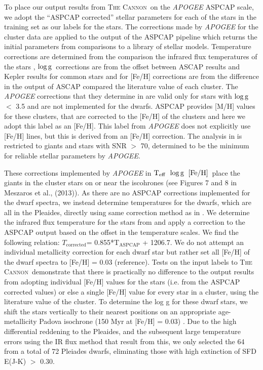 \documentclass[12pt, preprint]{aastex}
\newcommand{\teff}{\mbox{$\rm T_{eff}$}}
\newcommand{\feh}{\mbox{$\rm [Fe/H]$}}
\newcommand{\logg}{\mbox{$\rm \log g$}}
\newcommand{\tc}{\textsc{The Cannon}}
\begin{document}

To place our output results from \tc\ on the \textit{APOGEE} ASPCAP scale, we adopt the ``ASPCAP corrected'' stellar parameters for each of the stars in the training set as our labels for the stars. The corrections made by \textit{APOGEE} for the cluster data are applied to the output of the ASPCAP pipeline which returns the initial parameters from comparisons to a library of stellar models. Temperature corrections are determined from the comparison the infrared flux temperatures of the stars \citep{Gonzalez2009}, \logg\ corrections are from the offset between ASCAP results and Kepler results for common stars and for [Fe/H] corrections are from the difference in the output of ASCAP compared the literature value of each cluster.  The \textit{APOGEE} corrections that they determine in \citet{Meszaros2013} are valid only for stars with \logg\ $<$ 3.5 and are not implemented for the dwarfs. ASPCAP provides [M/H] values for these clusters, that are corrected to the [Fe/H] of the clusters and here we adopt this label as an [Fe/H]. This label from \textit{APOGEE} does not explicitly use [Fe/H] lines, but this is derived from an [Fe/H] correction. The analysis in \citet{Meszaros2013} is restricted to giants and stars with SNR $>$ 70, determined to be the minimum for reliable stellar parameters by \textit{APOGEE}. 

These corrections implemented by \textit{APOGEE} in \teff\, \logg\, \feh\ place the giants in the cluster stars on or near the iscohrones (see Figures 7 and 8 in Meszaros et al., (2013)).  As there are no ASPCAP corrections implemented for the dwarf spectra, we instead determine temperatures for the dwarfs, which are all in the Pleaides, directly using same correction method as in \citet{Meszaros2013}. We determine the infrared flux temperature for the stars from \citep{Gonzalez2009} and apply a correction to the ASPCAP output based on the offset in the temperature scales. We find the following relation: $T_{\mbox{corrected}}$= 0.855*T$_{\mbox{ASPCAP}}$ + 1206.7. We do not attempt an individual metallicity correction for each dwarf star but rather set all [Fe/H] of the dwarf spectra to [Fe/H] = 0.03 (reference). Tests on the input labels to \tc\ demonstrate that there is practically no difference to the output results from adopting individual [Fe/H] values for the stars (i.e. from the ASPCAP corrected values) or else a single [Fe/H] value for every star in a cluster, using the literature value of the cluster. To determine the log g for these dwarf stars, we shift the stars vertically to their nearest positions on an appropriate age-metallicity Padova isochrone (150 Myr at [Fe/H] = 0.03) \citep{Girardi2010}. Due to the high differential reddening to the Pleaides, and the subsequent large temperature errors using the IR flux method that result from this, we only selected the 64 from a total of 72 Pleiades dwarfs, eliminating those with high extinction of SFD E(J-K) $>$ 0.30.
\end{document}

